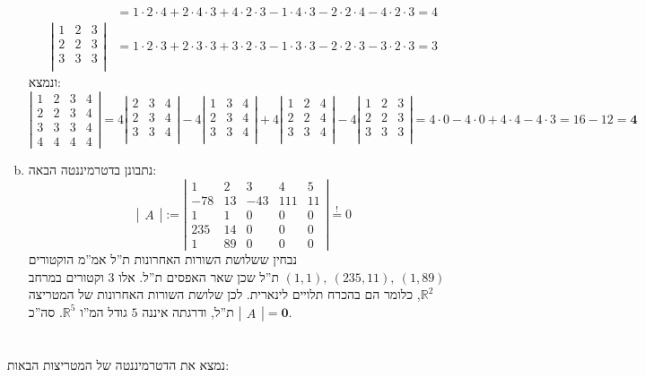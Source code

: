 \documentclass[]{article}
\newcommand\R     {\mathbb{R}}
\newcommand\seq   {\overset{!}{=}}
\newcommand\detms[1]   {\sof{\begin{matrix}
            #1
\end{matrix}}}
\newcommand\sof[1]    {\left | #1 \right |}
\theoremstyle{definition}
\begin{document}
\begin{enumerate}[(a)]
\begin{align*}
{            } &= 1 \cdot 2 \cdot 4 + 2 \cdot 4 \cdot 3 + 4 \cdot 2 \cdot 3 - 1 \cdot 4 \cdot 3 - 2 \cdot 2 \cdot 4 - 4 \cdot 2 \cdot 3 = 4 \\
            \detms{1 & 2 & 3 \\ 
                2 & 2 & 3 \\ 
                3 & 3 & 3 \\ 
            } &= 1 \cdot 2 \cdot 3 + 2 \cdot 3 \cdot 3 + 3 \cdot 2 \cdot 3 - 1 \cdot 3 \cdot 3 - 2 \cdot 2 \cdot 3 - 3 \cdot 2 \cdot 3 = 3
        \end{align*}
        ונמצא: 
        \[ \detms{1 & 2 & 3 & 4 \\ 2 & 2 & 3 & 4 \\ 3 & 3 & 3 & 4 \\ 4 & 4 & 4 &4} = 4\detms{2 & 3 & 4 \\ 
            2 & 3 & 4 \\ 
            3 & 3 & 4 \\ 
        } -4 \detms{1 & 3 & 4 \\ 
            2 & 3 & 4 \\ 
            3 & 3 & 4 \\ 
        } + 4\detms{1 & 2 & 4 \\ 
            2 & 2 & 4 \\ 
            3 & 3 & 4 \\ 
        } - 4\detms{1 & 2 & 3 \\ 
            2 & 2 & 3 \\ 
            3 & 3 & 3 \\ 
        } = 4 \cdot 0 - 4 \cdot 0 + 4 \cdot 4 - 4 \cdot 3 = 16 - 12 = \bm{4} \]
        \item נתבונן בדטרמיננטה הבאה: 
        \[ \detms{A} := \detms{1 & 2 & 3 & 4 &5 \\ -78 & 13 & -43 & 111 & 11 \\ 1 & 1 & 0 & 0 & 0 \\ 235 & 14 & 0 & 0 & 0 \\ 1 & 89 & 0 & 0 &0} \seq 0 \]
        נבחין ששלושת השורות האחרונות ת''ל אמ''מ הוקטורים $(1, 1), \ (235, 11), \ (1, 89)$ ת''ל שכן שאר האפסים ת''ל. אלו $3$ וקטורים במרחב $\R^{2}$, כלומר הם בהכרח תלויים לינארית. לכן שלושת השורות האחרונות של המטריצה ת''ל, ודרגתה איננה $5$ גודל המ''ו $\R^{5}$. סה''כ $\detms{A} = \bm{0}$. 
    \end{enumerate}
    
    \section{}
    נמצא את הדטרמיננטה של המטריצות הבאות: 
    
\end{document}

